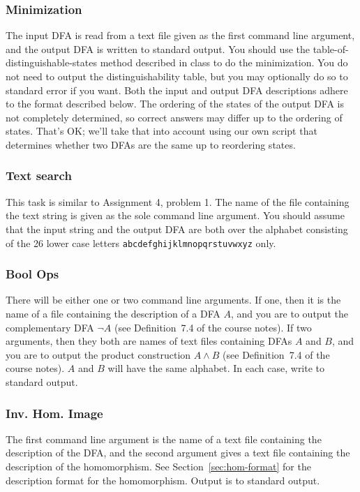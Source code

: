 \documentclass[11pt]{article}
\begin{document}
\subsubsection{Minimization}
The input DFA is read from a text file given as the first command
line argument, and the output DFA is written to standard output.
You should use the table-of-distinguishable-states method
described in class to do the minimization.  You do not need to
output the distinguishability table, but you may optionally do so
to standard error if you want.  Both the input and output DFA
descriptions adhere to the format described below.  The ordering
of the states of the output DFA is not completely determined, so
correct answers may differ up to the ordering of states.  That's
OK\@; we'll take that into account using our own script that
determines whether two DFAs are the same up to reordering states.

\subsubsection{Text search}
This task is similar to Assignment 4, problem 1.  The name of the
file containing the text string is given as the sole command line
argument.  You should assume that the input string and the output
DFA are both over the alphabet consisting of the 26 lower case
letters \texttt{abcdefghijklmnopqrstuvwxyz} only.

\subsubsection{Bool Ops}
There will be either one or two command line arguments.  If one,
then it is the name of a file containing the description of a DFA
$A$, and you are to output the complementary DFA $\neg A$ (see
Definition~7.4 of the course notes).  If two arguments, then they
both are names of text files containing DFAs $A$ and $B$, and you
are to output the product construction $A\wedge B$ (see
Definition~7.4 of the course notes).  $A$ and $B$ will have the
same alphabet.  In each case, write to standard output.

\subsubsection{Inv. Hom. Image}
The first command line argument is the name of a text file containing
the description of the DFA, and the second argument gives a text file
containing the description of the homomorphism.  See
Section~\ref{sec:hom-format} for the description format for the
homomorphism.  Output is to standard output.
\end{document}
